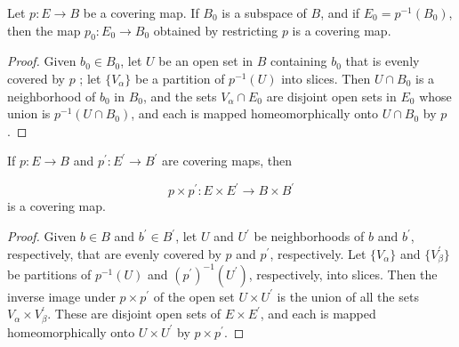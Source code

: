 \begin{theorem}
\label{thm:\thetheorem}
Let \(p : E \rightarrow B\) be a covering map. If \(B_{0}\) is a subspace of \(B\), and if \(E_{0} = p^{-1}( B_{0})\), then the map \(p_{0} : E_{0} \rightarrow {B}_{0}\) obtained by restricting \(p\) is a covering map.
\end{theorem}

\begin{proof}
Given \(b_{0} \in {B}_{0}\), let \(U\) be an open set in \(B\) containing \(b_{0}\) that is evenly covered by \(p\) ; let \(\{ V_{\alpha }\}\) be a partition of \(p^{-1}( U)\) into slices. Then \(U \cap {B}_{0}\) is a neighborhood of \(b_{0}\) in \(B_{0}\), and the sets \(V_{\alpha } \cap {E}_{0}\) are disjoint open sets in \(E_{0}\) whose union is \(p^{-1}( {U \cap {B}_{0}})\), and each is mapped homeomorphically onto \(U \cap {B}_{0}\) by \(p\).
\end{proof}
\begin{theorem}
\label{thm:\thetheorem}
If \(p : E \rightarrow B\) and \(p^{\prime } : E^{\prime } \rightarrow {B}^{\prime }\) are covering maps, then

\[
p \times {p}^{\prime } : E \times {E}^{\prime } \rightarrow B \times {B}^{\prime }
\]
is a covering map.
\end{theorem}

\begin{proof}
Given \(b \in B\) and \(b^{\prime } \in {B}^{\prime }\), let \(U\) and \(U^{\prime }\) be neighborhoods of \(b\) and \(b^{\prime }\), respectively, that are evenly covered by \(p\) and \(p^{\prime }\), respectively. Let \(\{ V_{\alpha }\}\) and \(\{ V_{\beta }^{\prime }\}\) be partitions of \(p^{-1}( U)\) and \({( p^{\prime }) }^{-1}( U^{\prime })\), respectively, into slices. Then the inverse image under \(p \times {p}^{\prime }\) of the open set \(U \times {U}^{\prime }\) is the union of all the sets \(V_{\alpha } \times {V}_{\beta }^{\prime }\). These are disjoint open sets of \(E \times {E}^{\prime }\), and each is mapped homeomorphically onto \(U \times {U}^{\prime }\) by \(p \times {p}^{\prime }\).
\end{proof}

